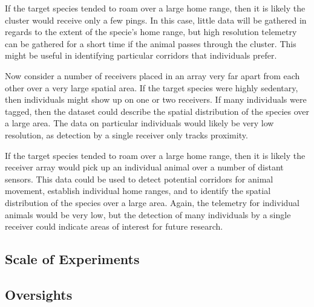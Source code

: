 If the target species tended to roam over a large home range, then it is likely the cluster would receive only a few pings.  In this case, little data will be gathered in regards to the extent of the specie's home range, but high resolution telemetry can be gathered for a short time if the animal passes through the cluster.  This might be useful in identifying particular corridors that individuals prefer.

Now consider a number of receivers placed in an array very far apart from each other over a very large spatial area.
If the target species were highly sedentary, then individuals might show up on one or two receivers.  If many individuals were tagged, then the dataset could describe the spatial distribution of the species over a large area.  The data on particular individuals would likely be very low resolution, as detection by a single receiver only tracks proximity.  

If the target species tended to roam over a large home range, then it is likely the receiver array would pick up an individual animal over a number of distant sensors.  This data could be used to detect potential corridors for animal movement, establish individual home ranges, and to identify the spatial distribution of the species over a large area.  Again, the telemetry for individual animals would be very low, but the detection of many individuals by a single receiver could indicate areas of interest for future research.


\subsection{Scale of Experiments}
\label{scaleOfExperiments}


\subsection{Oversights}
\label{oversights}

